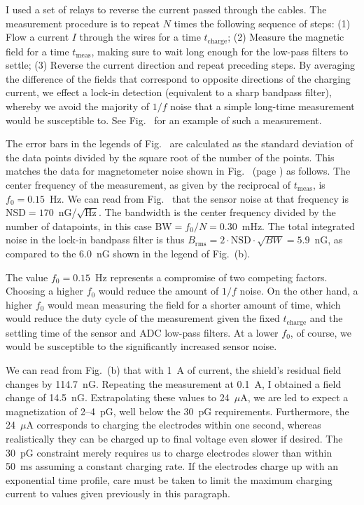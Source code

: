 I used a set of relays to reverse the current passed through the cables. The
measurement procedure is to repeat $N$ times the following sequence of steps:
(1) Flow a current $I$ through the wires for a time $t_\text{charge}$; (2)
Measure the magnetic field for a time $t_\text{meas}$, making sure to wait long
enough for the low-pass filters to settle; (3) Reverse the current direction and
repeat preceding steps. By averaging the difference of the fields that
correspond to opposite directions of the charging current, we effect a lock-in
detection (equivalent to a sharp bandpass filter), whereby we avoid the majority
of $1/f$ noise that a simple long-time measurement would be susceptible to. See
Fig.~ for an example of such a measurement.

The error bars in the legends of Fig.~ are calculated as the
standard deviation of the data points divided by the square root of the number
of the points. This matches the data for magnetometer noise shown in
Fig.~ (page \pageref{sensornoise}) as follows. The center
frequency of the measurement, as given by the reciprocal of $t_\text{meas}$, is
$f_0=0.15$~Hz. We can read from Fig.~ that the sensor noise at
that frequency is $\text{NSD}=170$~nG/$\sqrt{\text{Hz}}$. The bandwidth is the
center frequency divided by the number of datapoints, in this case
$\text{BW}=f_0/N=0.30$~mHz.  The total integrated noise in the lock-in bandpass
filter is thus $B_\text{rms}=2\cdot\text{NSD}\cdot\sqrt{BW}=5.9$~nG, as compared
to the 6.0~nG shown in the legend of Fig.~(b).

The value $f_0=0.15$~Hz represents a compromise of two competing factors.
Choosing a higher $f_0$ would reduce the amount of $1/f$ noise. On the other
hand, a higher $f_0$ would mean measuring the field for a shorter amount of
time, which would reduce the duty cycle of the measurement given the fixed
$t_\text{charge}$ and the settling time of the sensor and ADC low-pass filters.
At a lower $f_0$, of course, we would be susceptible to the significantly
increased sensor noise.

We can read from Fig.~(b) that with 1~A of current, the shield's
residual field changes by 114.7~nG. Repeating the measurement at 0.1~A, I
obtained a field change of 14.5~nG. Extrapolating these values to 24~$\mu$A, we
are led to expect a magnetization of 2--4~pG, well below the 30~pG requirements.
Furthermore, the 24~$\mu$A corresponds to charging the electrodes within one
second, whereas realistically they can be charged up to final voltage even
slower if desired. The 30~pG constraint merely requires us to charge electrodes
slower than within 50~ms assuming a constant charging rate. If the electrodes
charge up with an exponential time profile, care must be taken to limit the
maximum charging current to values given previously in this paragraph.

